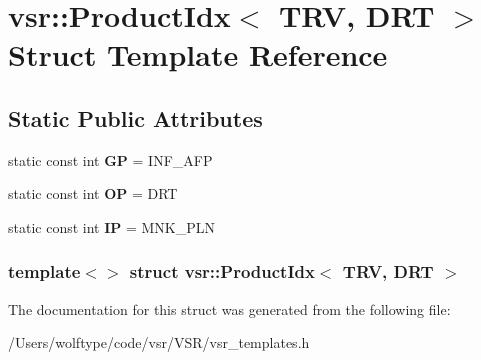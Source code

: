 \hypertarget{structvsr_1_1_product_idx_3_01_t_r_v_00_01_d_r_t_01_4}{\section{vsr\-:\-:Product\-Idx$<$ T\-R\-V, D\-R\-T $>$ Struct Template Reference}
\label{structvsr_1_1_product_idx_3_01_t_r_v_00_01_d_r_t_01_4}
}
\subsection*{Static Public Attributes}
\begin{DoxyCompactItemize}
\item 
\hypertarget{structvsr_1_1_product_idx_3_01_t_r_v_00_01_d_r_t_01_4_a53675f0f6a4c5c78a7327b9611da6306}{static const int {\bfseries G\-P} = I\-N\-F\-\_\-\-A\-F\-P}\label{structvsr_1_1_product_idx_3_01_t_r_v_00_01_d_r_t_01_4_a53675f0f6a4c5c78a7327b9611da6306}

\item 
\hypertarget{structvsr_1_1_product_idx_3_01_t_r_v_00_01_d_r_t_01_4_a4fbd9a49edc5870bb946fe9508b15610}{static const int {\bfseries O\-P} = D\-R\-T}\label{structvsr_1_1_product_idx_3_01_t_r_v_00_01_d_r_t_01_4_a4fbd9a49edc5870bb946fe9508b15610}

\item 
\hypertarget{structvsr_1_1_product_idx_3_01_t_r_v_00_01_d_r_t_01_4_a516a75ecf2b32bf4209496073ede219b}{static const int {\bfseries I\-P} = M\-N\-K\-\_\-\-P\-L\-N}\label{structvsr_1_1_product_idx_3_01_t_r_v_00_01_d_r_t_01_4_a516a75ecf2b32bf4209496073ede219b}

\end{DoxyCompactItemize}
\subsubsection*{template$<$$>$ struct vsr\-::\-Product\-Idx$<$ T\-R\-V, D\-R\-T $>$}



The documentation for this struct was generated from the following file\-:\begin{DoxyCompactItemize}
\item 
/\-Users/wolftype/code/vsr/\-V\-S\-R/vsr\-\_\-templates.\-h\end{DoxyCompactItemize}
